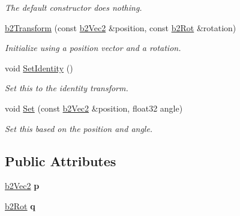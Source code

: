 \begin{DoxyCompactItemize}
\begin{DoxyCompactList}\small\item\em The default constructor does nothing. \end{DoxyCompactList}\item 
\mbox{\label{structb2Transform_a823e190e4810e35e8100f4414d0bef62}} 
\hyperlink{structb2Transform_a823e190e4810e35e8100f4414d0bef62}{b2\+Transform} (const \hyperlink{structb2Vec2}{b2\+Vec2} \&position, const \hyperlink{structb2Rot}{b2\+Rot} \&rotation)
\begin{DoxyCompactList}\small\item\em Initialize using a position vector and a rotation. \end{DoxyCompactList}\item 
\mbox{\label{structb2Transform_af92af4ec6833552b1b22a6ca6d4f5644}} 
void \hyperlink{structb2Transform_af92af4ec6833552b1b22a6ca6d4f5644}{Set\+Identity} ()
\begin{DoxyCompactList}\small\item\em Set this to the identity transform. \end{DoxyCompactList}\item 
\mbox{\label{structb2Transform_a4db696a0b3fada95f95cde3e7e85ced9}} 
void \hyperlink{structb2Transform_a4db696a0b3fada95f95cde3e7e85ced9}{Set} (const \hyperlink{structb2Vec2}{b2\+Vec2} \&position, float32 angle)
\begin{DoxyCompactList}\small\item\em Set this based on the position and angle. \end{DoxyCompactList}\end{DoxyCompactItemize}
\subsection*{Public Attributes}
\begin{DoxyCompactItemize}
\item 
\mbox{\label{structb2Transform_a9eeeb643a016c29a4d389e480ba6c628}} 
\hyperlink{structb2Vec2}{b2\+Vec2} {\bfseries p}
\item 
\mbox{\label{structb2Transform_ae4aaac23f32686e165138c4e5dc4ce85}} 
\hyperlink{structb2Rot}{b2\+Rot} {\bfseries q}
\end{DoxyCompactItemize}


